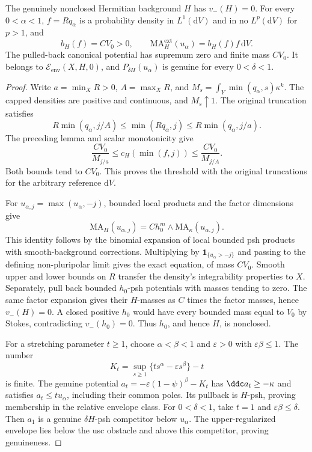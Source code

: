 \begin{theorem}\label{thm:zero-lower-mass-product-equation}
The genuinely nonclosed Hermitian background $H$ has $v_-(H)=0$. For every $0<\alpha<1$, $f=Rq_\alpha$ is a probability density in $L^1(\mathrm{d}V)$ and in no $L^p(\mathrm{d}V)$ for $p>1$, and
\[
 b_H(f)=CV_0>0,\qquad
 \mathrm{MA}^{\mathrm{ext}}_H(u_\alpha)=b_H(f)f\,\mathrm{d}V.
\]
The pulled-back canonical potential has supremum zero and finite mass $CV_0$. It belongs to $\mathcal E_{\mathrm{env}}(X,H,0)$, and $P_{\delta H}(u_\alpha)$ is genuine for every $0<\delta<1$.
\end{theorem}
\begin{proof}
Write $a=\min_XR>0$, $A=\max_XR$, and $M_s=\int_Y\min(q_\alpha,s)\kappa^k$. The capped densities are positive and continuous, and $M_s\uparrow1$. The original truncation satisfies
\[
 R\min(q_\alpha,j/A)\leq\min(Rq_\alpha,j)
                         \leq R\min(q_\alpha,j/a).
\]
The preceding lemma and scalar monotonicity give
\[
 \frac{CV_0}{M_{j/a}}\leq c_H(\min(f,j))
                         \leq\frac{CV_0}{M_{j/A}}.
\]
Both bounds tend to $CV_0$. This proves the threshold with the original truncations for the arbitrary reference $\mathrm{d}V$.

For $u_{\alpha,j}=\max(u_\alpha,-j)$, bounded local products and the factor dimensions give
\[
 \mathrm{MA}_H(u_{\alpha,j})
       =C h_0^m\wedge\mathrm{MA}_\kappa(u_{\alpha,j}).
\]
This identity follows by the binomial expansion of local bounded psh products with smooth-background corrections. Multiplying by $\mathbf1_{\{u_\alpha>-j\}}$ and passing to the defining non-pluripolar limit gives the exact equation, of mass $CV_0$. Smooth upper and lower bounds on $R$ transfer the density's integrability properties to $X$. Separately, pull back bounded $h_0$-psh potentials with masses tending to zero. The same factor expansion gives their $H$-masses as $C$ times the factor masses, hence $v_-(H)=0$. A closed positive $h_0$ would have every bounded mass equal to $V_0$ by Stokes, contradicting $v_-(h_0)=0$. Thus $h_0$, and hence $H$, is nonclosed.

For a stretching parameter $t\geq1$, choose $\alpha<\beta<1$ and $\varepsilon>0$ with $\varepsilon\beta\leq1$. The number
\[
 K_t=\sup_{s\geq1}\{t s^\alpha-\varepsilon s^\beta\}-t
\]
is finite. The genuine potential $a_t=-\varepsilon(1-\psi)^\beta-K_t$ has $\ddc a_t\geq-\kappa$ and satisfies $a_t\leq t u_\alpha$, including their common poles. Its pullback is $H$-psh, proving membership in the relative envelope class. For $0<\delta<1$, take $t=1$ and $\varepsilon\beta\leq\delta$. Then $a_1$ is a genuine $\delta H$-psh competitor below $u_\alpha$. The upper-regularized envelope lies below the usc obstacle and above this competitor, proving genuineness.
\end{proof}

